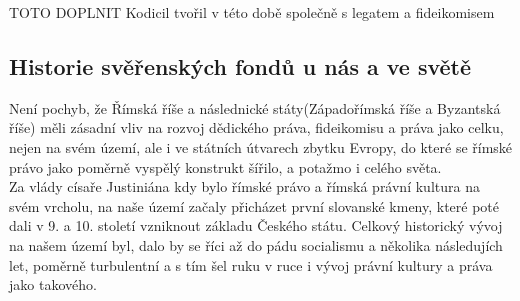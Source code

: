 \documentclass{article}
\begin{document}




TOTO DOPLNIT
Kodicil tvořil v této době společně s legatem a fideikomisem 

\newpage

\subsection{Historie svěřenských fondů u nás a ve světě}

Není pochyb, že Římská říše a následnické státy(Západořímská říše a Byzantská říše) měli zásadní vliv na rozvoj dědického práva, fideikomisu a práva jako celku, nejen na svém území, ale i ve státních útvarech zbytku Evropy, do které se římské právo jako poměrně vyspělý konstrukt šířilo, a potažmo i celého světa.\\

Za vlády císaře Justiniána kdy bylo římské právo a římská právní kultura na svém vrcholu, na naše území začaly přicházet první slovanské kmeny, které poté dali v 9. a 10. století vzniknout základu Českého státu. Celkový historický vývoj na našem území byl, dalo by se říci až do pádu socialismu a několika následujích let, poměrně turbulentní a s tím šel ruku v ruce i vývoj právní kultury a práva jako takového. \\
\end{document}
